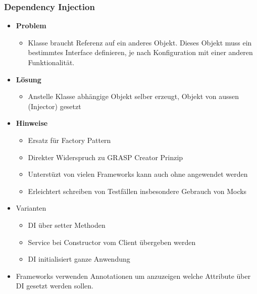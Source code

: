 \documentclass[../ZF_SWEN1.tex]{subfiles}
\begin{document}
\subsubsection{Dependency Injection}
\begin{itemize}
	\item \textbf{Problem}
	\begin{itemize}
		\item Klasse braucht Referenz auf ein anderes Objekt. Dieses Objekt muss ein bestimmtes Interface definieren, je nach Konfiguration mit einer anderen Funktionalität.
	\end{itemize}
	\item \textbf{Lösung}
	\begin{itemize}
		\item Anstelle Klasse abhängige Objekt selber erzeugt, Objekt von aussen (Injector) gesetzt
	\end{itemize}
	\item \textbf{Hinweise}
	\begin{itemize}
		\item Ersatz für Factory Pattern
		\item Direkter Widerspruch zu GRASP Creator Prinzip
		\item Unterstüzt von vielen Frameworks kann auch ohne angewendet werden
		\item Erleichtert schreiben von Testfällen insbesondere Gebrauch von Mocks
	\end{itemize}
	\item Varianten
	\begin{itemize}
		\item DI über setter Methoden
		\item Service bei Constructor vom Client übergeben werden
		\item DI initialisiert ganze Anwendung
	\end{itemize}
	\item Frameworks verwenden Annotationen um anzuzeigen welche Attribute über DI gesetzt werden sollen.
	
\end{itemize}
\end{document}

